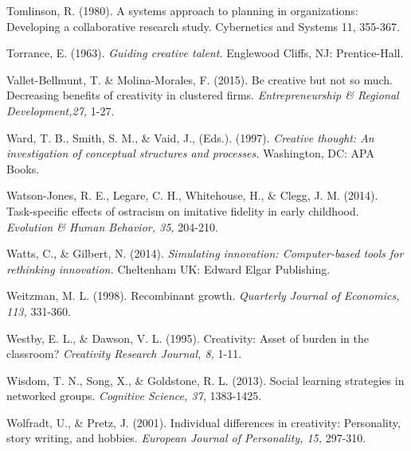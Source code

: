 \documentclass[a4paper,12pt,man,british]{apa6}
\begin{document}
\begin{description}
\item Tomlinson, R. (1980). A systems approach to planning in organizations: Developing a collaborative research study. {Cybernetics and Systems 11,} 355-367.

\item Torrance, E. (1963). \emph{ Guiding creative talent.} Englewood Cliffs, NJ: Prentice-Hall.



\item Vallet-Bellmunt, T. \& Molina-Morales, F. (2015). Be creative but not so much. Decreasing benefits of creativity in clustered firms. \emph{Entrepreneurship \& Regional Development,27,} 1-27.

\item Ward, T. B., Smith, S. M., \& Vaid, J., (Eds.). (1997). \emph{Creative thought: An investigation of conceptual structures and processes.} Washington, DC: APA Books.

\item Watson-Jones, R. E., Legare, C. H., Whitehouse, H., \& Clegg, J. M. (2014). Task-specific effects of ostracism on imitative fidelity in early childhood. \emph{Evolution \& Human Behavior, 35,} 204-210.

\item Watts, C., \& Gilbert, N. (2014). {\it Simulating innovation: Computer-based tools for rethinking innovation.} Cheltenham UK: Edward Elgar Publishing.

\item Weitzman, M. L. (1998). Recombinant growth. \emph{ Quarterly Journal of Economics, 113,} 331-360.

\item Westby, E. L., \& Dawson, V. L. (1995). Creativity: Asset of burden in the classroom? \emph{Creativity Research Journal, 8,} 1-11.

\item Wisdom, T. N., Song, X., \& Goldstone, R. L. (2013). Social learning strategies in networked groups. \emph{\it Cognitive Science, 37,} 1383-1425.

\item Wolfradt, U., \& Pretz, J. (2001). Individual differences in creativity: Personality, story writing, and hobbies. \emph{European Journal of Personality, 15,} 297-310.

\end{description}
\end{document}

